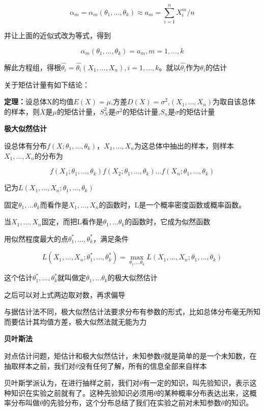 \documentclass{ctexart}
\begin{document}
	\[\alpha_m=\alpha_m(\theta_1,...,\theta_k)\approx a_m=\sum_{i=1}^{n}X_i^m/n\]
	
	并让上面的近似式改为等式，得到
	
	\[\alpha_m(\theta_1,...,\theta_k)=a_m, m=1,...,k\]
	
	解此方程组，得根\(\hat{\theta_i}=\hat{\theta_i}(X_1,...,X_n), i=1,...,k\)。就以\(\hat{\theta_i}\)作为\(\theta_i\)的估计
	
	关于矩估计量有如下结论：
	
	\textbf{定理：}设总体X的均值\(E(X)=\mu\),方差\(D(X)=\sigma^2\),\((X_1,...,X_n)\)为取自该总体的样本，则\(\overline{X}\)是\(\mu\)的矩估计量，\(S_N^2\)是\(\sigma^2\)的矩估计量,\(S_n\)是\(\sigma\)的矩估计量
	
	\mbox{}
	
	\textbf{极大似然估计}
	
	设总体有分布\(f(X; \theta_1,...,\theta_k)\)，\(X_1,...,X_n\)为这总体中抽出的样本，则样本\(X_1,...,X_n\)的分布为
	
	\[f(X_1; \theta_1,...,\theta_k)f(X_2; \theta_1,...,\theta_k)...f(X_n; \theta_1,...,\theta_k)\]
	
	记为\(L(X_1,...,X_n;\theta_1,...,\theta_k)\)
	
	固定\(\theta_1,...\theta_k\)而看作是\(X_1,...,X_n\)的函数时，L是一个概率密度函数或概率函数。
	
	当\(X_1,...,X_n\)固定，而把L看作是\(\theta_1,...\theta_k\)的函数时，它成为似然函数
	
	用似然程度最大的点\(\theta_1^*,...,\theta_k^*\)，满足条件
	
	\[L(X_1,...,X_n;\theta_1^*,...,\theta_k^*)=\max_{\theta_1,...\theta_k}L(X_1,...,X_n;\theta_1,...,\theta_k)\]
	
	这个估计\(\theta_1^*,...,\theta_k^*\)就叫做定\(\theta_1,...\theta_k\)的极大似然估计
	
	之后可以对上式两边取对数，再求偏导
	
	{\color{red}与据估计法不同，极大似然估计法要求分布有参数的形式，比如总体分布毫无所知而要估计其均值方差，极大似然法就无能为力}
	
	\mbox{}
	
	\textbf{贝叶斯法}
	
	对点估计问题，矩估计和极大似然估计，未知参数\(\theta\)就是简单的是一个未知数，在抽取样本之前，我们对\(\theta\)没有任何了解，所有的信息全部来自样本
	
	贝叶斯学派认为，在进行抽样之前，我们对\(\theta\)有一定的知识，叫先验知识，表示这种知识在实验之前就有了。这种先验知识必须用\(\theta\)的某种概率分布表达出来，这概率分布叫做\(\theta\)的先验分布，这个分布总结了我们在实验之前对未知参数\(\theta\)的知识。
	
\end{document}
